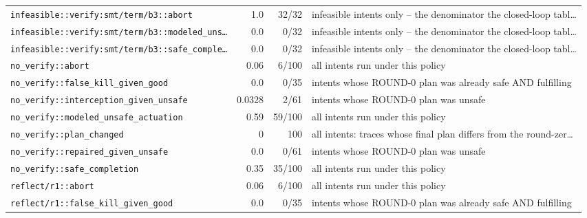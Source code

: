 \begin{center}
\begin{longtable}{@{}p{}rrp{}@{}}
\texttt{\scriptsize infeasible:\allowbreak :\allowbreak verify:\allowbreak smt/\allowbreak term/\allowbreak b3:\allowbreak :\allowbreak abort} & 1.0 & 32/32 & infeasible intents only -- the denominator the closed-loop tabl… \\
\texttt{\scriptsize infeasible:\allowbreak :\allowbreak verify:\allowbreak smt/\allowbreak term/\allowbreak b3:\allowbreak :\allowbreak modeled\_\allowbreak uns…} & 0.0 & 0/32 & infeasible intents only -- the denominator the closed-loop tabl… \\
\texttt{\scriptsize infeasible:\allowbreak :\allowbreak verify:\allowbreak smt/\allowbreak term/\allowbreak b3:\allowbreak :\allowbreak safe\_\allowbreak comple…} & 0.0 & 0/32 & infeasible intents only -- the denominator the closed-loop tabl… \\
\texttt{\scriptsize no\_\allowbreak verify:\allowbreak :\allowbreak abort} & 0.06 & 6/100 & all intents run under this policy \\
\texttt{\scriptsize no\_\allowbreak verify:\allowbreak :\allowbreak false\_\allowbreak kill\_\allowbreak given\_\allowbreak good} & 0.0 & 0/35 & intents whose ROUND-0 plan was already safe AND fulfilling \\
\texttt{\scriptsize no\_\allowbreak verify:\allowbreak :\allowbreak interception\_\allowbreak given\_\allowbreak unsafe} & 0.0328 & 2/61 & intents whose ROUND-0 plan was unsafe \\
\texttt{\scriptsize no\_\allowbreak verify:\allowbreak :\allowbreak modeled\_\allowbreak unsafe\_\allowbreak actuation} & 0.59 & 59/100 & all intents run under this policy \\
\texttt{\scriptsize no\_\allowbreak verify:\allowbreak :\allowbreak plan\_\allowbreak changed} & 0 & 100 & all intents: traces whose final plan differs from the round-zer… \\
\texttt{\scriptsize no\_\allowbreak verify:\allowbreak :\allowbreak repaired\_\allowbreak given\_\allowbreak unsafe} & 0.0 & 0/61 & intents whose ROUND-0 plan was unsafe \\
\texttt{\scriptsize no\_\allowbreak verify:\allowbreak :\allowbreak safe\_\allowbreak completion} & 0.35 & 35/100 & all intents run under this policy \\
\texttt{\scriptsize reflect/\allowbreak r1:\allowbreak :\allowbreak abort} & 0.06 & 6/100 & all intents run under this policy \\
\texttt{\scriptsize reflect/\allowbreak r1:\allowbreak :\allowbreak false\_\allowbreak kill\_\allowbreak given\_\allowbreak good} & 0.0 & 0/35 & intents whose ROUND-0 plan was already safe AND fulfilling \\

\end{longtable}
\end{center}
